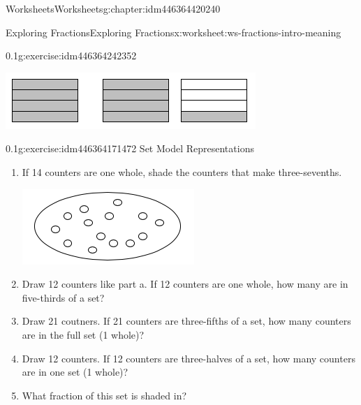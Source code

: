 \documentclass[twoside,11pt,]{book}
\begin{document}
\begin{chapterptx}{Worksheets}{}{Worksheets}{}{}{g:chapter:idm446364420240}
\begin{worksheet-section-numberless}{Exploring Fractions}{}{Exploring Fractions}{}{}{x:worksheet:ws-fractions-intro-meaning}
\begin{divisionexercise}{1}{}{0.1}{g:exercise:idm446364242352}
\begin{enumerate}[label=(\alph*)]
\begin{sidebyside}{1}{0.25}{0.25}{0}
\begin{sbspanel}{0.5}
\includegraphics[width=1\linewidth]{images/nine-fourths-vs-twelfths.png}
\end{sbspanel}%
\end{sidebyside}%
%
\end{enumerate}
\end{divisionexercise}%
\begin{divisionexercise}{2}{}{0.1}{g:exercise:idm446364171472}%
Set Model Representations%
%
\begin{enumerate}[label=(\alph*)]
\item{}If 14 counters are one whole, shade the counters that make three-sevenths. \begin{sidebyside}{1}{0.35}{0.35}{0}%
\begin{sbspanel}{0.3}%
\includegraphics[width=1\linewidth]{images/fourteen-counters.png}
\end{sbspanel}%
\end{sidebyside}%
%
\item{}Draw 12 counters like part a. If 12 counters are one whole, how many are in five-thirds of a set?%
\item{}Draw 21 coutners. If 21 counters are three-fifths of a set, how many counters are in the full set (1 whole)?%
\item{}Draw 12 counters. If 12 counters are three-halves of a set, how many counters are in one set (1 whole)?%
\item{}What fraction of this set is shaded in? \begin{sidebyside}{1}{0.35}{0.35}{0}%
\begin{sbspanel}{0.3}%

\end{sbspanel}
\end{sidebyside}
\end{enumerate}
\end{divisionexercise}
\end{worksheet-section-numberless}
\end{chapterptx}
\end{document}

